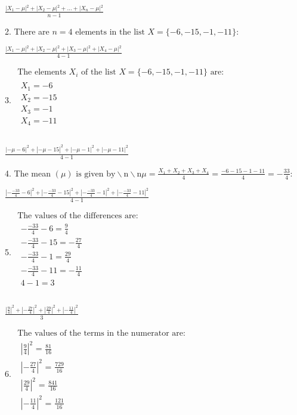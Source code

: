 \documentclass{article}
\begin{document}
$\frac{\left| X_1-\mu \right| {}^2+\left| X_2-\mu \right| {}^2+\ldots +\left| X_n-\mu \right| {}^2}{n-1}$

2. There are $n=4\text{ elements in the list }X=\{-6,-15,-1,-11\}$:

$\frac{\left| X_1-\mu \right| {}^2+\left| X_2-\mu \right| {}^2+\left| X_3-\mu \right| {}^2+\left| X_4-\mu \right| {}^2}{4-1}$

3. $\begin{array}{l}
\text{The elements }X_i\text{ of the list }X=\{-6,-15,-1,-11\}\text{ are: }\\
 
\begin{array}{l}
X_1=-6 \\
 X_2=-15 \\
 X_3=-1 \\
 X_4=-11 \\
\end{array}
 \\
\end{array}$

$\frac{| -\mu -6| ^2+| -\mu -15| ^2+| -\mu -1| ^2+| -\mu -11| ^2}{4-1}$

4. The mean $(\mu )\text{ is given by$\backslash $n$\backslash $n}\mu =\frac{X_1+X_2+X_3+X_4}{4}=\frac{-6-15-1-11}{4}=-\frac{33}{4}$:

$\frac{\left| -\frac{-33}{4}-6\right| ^2+\left| -\frac{-33}{4}-15\right| ^2+\left| -\frac{-33}{4}-1\right| ^2+\left| -\frac{-33}{4}-11\right| ^2}{4-1}$

5. $\begin{array}{l}
\text{The values of the differences are: }\\
 
\begin{array}{l}
-\frac{-33}{4}-6=\frac{9}{4} \\
 -\frac{-33}{4}-15=-\frac{27}{4} \\
 -\frac{-33}{4}-1=\frac{29}{4} \\
 -\frac{-33}{4}-11=-\frac{11}{4} \\
 4-1=3 \\
\end{array}
 \\
\end{array}$

$\frac{\left| \frac{9}{4}\right| ^2+\left| -\frac{27}{4}\right| ^2+\left| \frac{29}{4}\right| ^2+\left| -\frac{11}{4}\right| ^2}{3}$

6. $\begin{array}{l}
\text{The values of the terms in the numerator are}: \\
 
\begin{array}{l}
\left| \frac{9}{4}\right| ^2\text{ = }\frac{81}{16} \\
 \left| -\frac{27}{4}\right| ^2\text{ = }\frac{729}{16} \\
 \left| \frac{29}{4}\right| ^2\text{ = }\frac{841}{16} \\
 \left| -\frac{11}{4}\right| ^2\text{ = }\frac{121}{16} \\
\end{array}
 \\
\end{array}$
\end{document}
